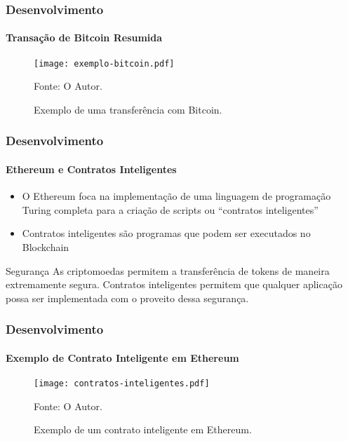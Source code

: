 \documentclass[aspectratio=169]{beamer}
\begin{document}
\begin{frame}
    \frametitle{Desenvolvimento}
    \framesubtitle{Transação de Bitcoin Resumida}
    
    \begin{figure}[H]
        \caption{\label{fig:exemplo-bitcoin}Exemplo de uma transferência
            com Bitcoin.}
        \begin{center}
            \texttt{[image: exemplo-bitcoin.pdf]}
        \end{center}
        Fonte: O Autor.
    \end{figure}
\end{frame}

\begin{frame}
    \frametitle{Desenvolvimento}
    \framesubtitle{Ethereum e Contratos Inteligentes}
    
    \begin{itemize}
        \item O Ethereum foca na implementação de uma linguagem de
            programação Turing completa para a criação de scripts ou
            ``contratos inteligentes'' \cite{Narayanan2016}\pause

        \item Contratos inteligentes são programas que podem ser
            executados no Blockchain\pause
    \end{itemize}

    \begin{block}{Segurança}
        As criptomoedas permitem a transferência de tokens de maneira
        extremamente segura. Contratos inteligentes permitem que
        qualquer aplicação possa ser implementada com o proveito dessa
        segurança.
    \end{block}
\end{frame}

\begin{frame}
    \frametitle{Desenvolvimento}
    \framesubtitle{Exemplo de Contrato Inteligente em Ethereum}
\begin{figure}[H]
    \caption{\label{fig:contratos-inteligentes}Exemplo de um contrato
    inteligente em Ethereum.}
    \begin{center}
        \texttt{[image: contratos-inteligentes.pdf]}
    \end{center}
    Fonte: O Autor.
\end{figure}

\end{frame}
\end{document}
